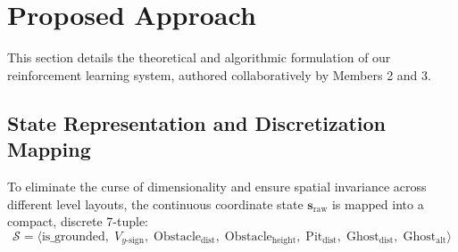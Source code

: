 \section{Proposed Approach}
\label{sec:approach}

This section details the theoretical and algorithmic formulation of our reinforcement learning system, authored collaboratively by Members 2 and 3.

\subsection{State Representation and Discretization Mapping}
To eliminate the curse of dimensionality and ensure spatial invariance across different level layouts, the continuous coordinate state $\mathbf{s}_{\text{raw}}$ is mapped into a compact, discrete 7-tuple:
\begin{equation}
\mathcal{S} = \langle \text{is\_grounded}, \; V_{y\text{-sign}}, \; \text{Obstacle}_{\text{dist}}, \; \text{Obstacle}_{\text{height}}, \; \text{Pit}_{\text{dist}}, \; \text{Ghost}_{\text{dist}}, \; \text{Ghost}_{\text{alt}} \rangle
\end{equation}

